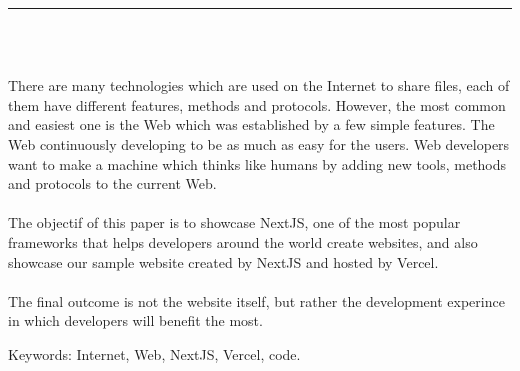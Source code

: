 \documentclass[12pt]{report}
\newenvironment{changemargin}[2]{%
\begin{list}{}{%
\setlength{\topsep}{0pt}%
\setlength{\leftmargin}{#1}%
\setlength{\rightmargin}{#2}%
\setlength{\listparindent}{\parindent}%
\setlength{\itemindent}{\parindent}%
\setlength{\parsep}{\parskip}%
}%
\item[]}{\end{list}}
\begin{document}
\begin{center}
    {\color{Blue} \rule{3in}{1.4mm} }\\
    \vspace{0.1in}
    \scshape{\fontsize{34}{46}{\bfseries{\color{Blue}{Abstract}}}}
    \\
    \vspace{0.6in}
\end{center}
\begin{changemargin}{0.9cm}{0.9cm}
\hspace*{0.16in}
There are many technologies which are used on the Internet to share files, each of them have different features, methods and protocols. However, the most common and easiest one is the Web which was established by a few simple features. The Web continuously developing to be as much as easy for the users. Web developers want to make a machine which thinks like humans by adding new tools, methods and protocols to the current Web.
\\\\
\hspace*{0.16in}
The objectif of this paper is to showcase NextJS, one of the most popular frameworks that helps developers around the world create websites, and also showcase our sample website created by NextJS and hosted by Vercel.
\\\\
\hspace*{0.16in}
The final outcome is not the website itself, but rather the development experince in which developers will benefit the most.
\end{changemargin}

\vspace{1in}

\begin{changemargin}{0.9cm}{0.9cm}
Keywords: Internet, Web, NextJS, Vercel, code.
\end{changemargin}

\newpage

\tableofcontents

\newpage

\listoffigures

\newpage
\end{document}
